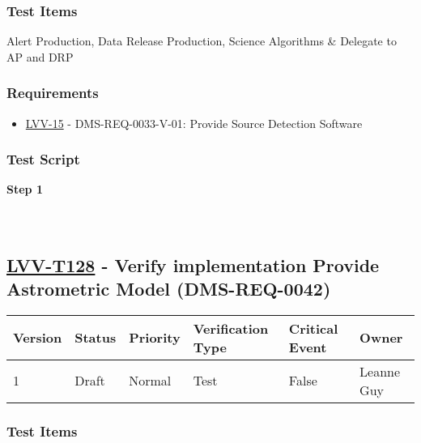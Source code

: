\hypertarget{test-items-27}{%
\subsubsection{Test Items}\label{test-items-27}}

Alert Production, Data Release Production, Science Algorithms \&
Delegate to AP and DRP

\hypertarget{requirements-27}{%
\subsubsection{Requirements}\label{requirements-27}}

\begin{itemize}
\tightlist
\item
  \href{https://jira.lsstcorp.org/browse/LVV-15}{LVV-15} -
  DMS-REQ-0033-V-01: Provide Source Detection Software
\end{itemize}

\hypertarget{test-script-27}{%
\subsubsection{Test Script}\label{test-script-27}}

\textbf{Step 1}\\
~\\
~\\

\hypertarget{lvv-t128---verify-implementation-provide-astrometric-model-dms-req-0042}{%
\subsection{\texorpdfstring{\href{https://jira.lsstcorp.org/secure/Tests.jspa\#/testCase/LVV-T128}{LVV-T128}
- Verify implementation Provide Astrometric Model
(DMS-REQ-0042)}{LVV-T128 - Verify implementation Provide Astrometric Model (DMS-REQ-0042)}}\label{lvv-t128---verify-implementation-provide-astrometric-model-dms-req-0042}}

\begin{longtable}[]{@{}llllll@{}}
\toprule
Version & Status & Priority & Verification Type & Critical Event &
Owner\tabularnewline
\midrule
\endhead
1 & Draft & Normal & Test & False & Leanne Guy\tabularnewline
\bottomrule
\end{longtable}

\hypertarget{test-items-28}{%
\subsubsection{Test Items}\label{test-items-28}}

